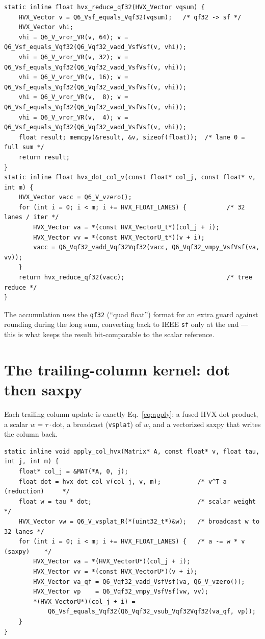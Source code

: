 \documentclass[11pt]{article}
\newcommand{\code}[1]{\texttt{\small #1}}
\newcommand{\file}[1]{\textcolor{hvxblue}{\texttt{#1}}}
\begin{document}
\begin{lstlisting}[caption={\file{hvx\_utils.h} --- the reduction and the fused dot product (verbatim).}]
static inline float hvx_reduce_qf32(HVX_Vector vqsum) {
    HVX_Vector v = Q6_Vsf_equals_Vqf32(vqsum);   /* qf32 -> sf */
    HVX_Vector vhi;
    vhi = Q6_V_vror_VR(v, 64); v = Q6_Vsf_equals_Vqf32(Q6_Vqf32_vadd_VsfVsf(v, vhi));
    vhi = Q6_V_vror_VR(v, 32); v = Q6_Vsf_equals_Vqf32(Q6_Vqf32_vadd_VsfVsf(v, vhi));
    vhi = Q6_V_vror_VR(v, 16); v = Q6_Vsf_equals_Vqf32(Q6_Vqf32_vadd_VsfVsf(v, vhi));
    vhi = Q6_V_vror_VR(v,  8); v = Q6_Vsf_equals_Vqf32(Q6_Vqf32_vadd_VsfVsf(v, vhi));
    vhi = Q6_V_vror_VR(v,  4); v = Q6_Vsf_equals_Vqf32(Q6_Vqf32_vadd_VsfVsf(v, vhi));
    float result; memcpy(&result, &v, sizeof(float));  /* lane 0 = full sum */
    return result;
}
static inline float hvx_dot_col_v(const float* col_j, const float* v, int m) {
    HVX_Vector vacc = Q6_V_vzero();
    for (int i = 0; i < m; i += HVX_FLOAT_LANES) {           /* 32 lanes / iter */
        HVX_Vector va = *(const HVX_VectorU_t*)(col_j + i);
        HVX_Vector vv = *(const HVX_VectorU_t*)(v + i);
        vacc = Q6_Vqf32_vadd_Vqf32Vqf32(vacc, Q6_Vqf32_vmpy_VsfVsf(va, vv));
    }
    return hvx_reduce_qf32(vacc);                            /* tree reduce */
}
\end{lstlisting}

\noindent The accumulation uses the \code{qf32} (``quad float'') format for an extra
guard against rounding during the long sum, converting back to IEEE \code{sf} only at
the end --- this is what keeps the result bit-comparable to the scalar reference.

\section{The trailing-column kernel: dot then saxpy}
Each trailing column update is exactly Eq.~\eqref{eq:apply}: a fused HVX dot product, a
scalar $w=\tau\cdot\text{dot}$, a broadcast (\code{vsplat}) of $w$, and a vectorized
saxpy that writes the column back.

\begin{lstlisting}[caption={\code{apply\_col\_hvx} --- update one trailing column (verbatim).}]
static inline void apply_col_hvx(Matrix* A, const float* v, float tau, int j, int m) {
    float* col_j = &MAT(*A, 0, j);
    float dot = hvx_dot_col_v(col_j, v, m);          /* v^T a  (reduction)     */
    float w = tau * dot;                             /* scalar weight          */
    HVX_Vector vw = Q6_V_vsplat_R(*(uint32_t*)&w);   /* broadcast w to 32 lanes */
    for (int i = 0; i < m; i += HVX_FLOAT_LANES) {   /* a -= w * v  (saxpy)    */
        HVX_Vector va = *(HVX_VectorU*)(col_j + i);
        HVX_Vector vv = *(const HVX_VectorU*)(v + i);
        HVX_Vector va_qf = Q6_Vqf32_vadd_VsfVsf(va, Q6_V_vzero());
        HVX_Vector vp    = Q6_Vqf32_vmpy_VsfVsf(vw, vv);
        *(HVX_VectorU*)(col_j + i) =
            Q6_Vsf_equals_Vqf32(Q6_Vqf32_vsub_Vqf32Vqf32(va_qf, vp));
    }
}
\end{lstlisting}
\end{document}
